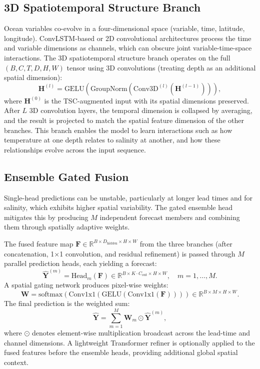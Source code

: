 \documentclass[conference]{IEEEtran}
\begin{document}
\subsection{3D Spatiotemporal Structure Branch}

Ocean variables co-evolve in a four-dimensional space (variable, time, latitude, longitude). ConvLSTM-based or 2D convolutional architectures process the time and variable dimensions as channels, which can obscure joint variable-time-space interactions. The 3D spatiotemporal structure branch operates on the full $(B, C, T, D, H, W)$ tensor using 3D convolutions (treating depth as an additional spatial dimension):
\begin{equation}
\mathbf{H}^{(l)} = \text{GELU}(\text{GroupNorm}(\text{Conv3D}^{(l)}(\mathbf{H}^{(l-1)}))),
\end{equation}
where $\mathbf{H}^{(0)}$ is the TSC-augmented input with its spatial dimensions preserved. After $L$ 3D convolution layers, the temporal dimension is collapsed by averaging, and the result is projected to match the spatial feature dimension of the other branches. This branch enables the model to learn interactions such as how temperature at one depth relates to salinity at another, and how these relationships evolve across the input sequence.

\subsection{Ensemble Gated Fusion}

Single-head predictions can be unstable, particularly at longer lead times and for salinity, which exhibits higher spatial variability. The gated ensemble head mitigates this by producing $M$ independent forecast members and combining them through spatially adaptive weights.

The fused feature map $\mathbf{F} \in \mathbb{R}^{B \times D_{\text{hidden}} \times H \times W}$ from the three branches (after concatenation, 1$\times$1 convolution, and residual refinement) is passed through $M$ parallel prediction heads, each yielding a forecast:
\begin{equation}
\hat{\mathbf{Y}}^{(m)} = \text{Head}_m(\mathbf{F}) \in \mathbb{R}^{B \times K \cdot C_{\text{out}} \times H \times W},\quad m = 1,\ldots,M.
\end{equation}
A spatial gating network produces pixel-wise weights:
\begin{equation}
\mathbf{W} = \text{softmax}(\text{Conv1x1}(\text{GELU}(\text{Conv1x1}(\mathbf{F})))) \in \mathbb{R}^{B \times M \times H \times W}.
\end{equation}
The final prediction is the weighted sum:
\begin{equation}
\hat{\mathbf{Y}} = \sum_{m=1}^{M} \mathbf{W}_m \odot \hat{\mathbf{Y}}^{(m)},
\end{equation}
where $\odot$ denotes element-wise multiplication broadcast across the lead-time and channel dimensions. A lightweight Transformer refiner is optionally applied to the fused features before the ensemble heads, providing additional global spatial context.
\end{document}
